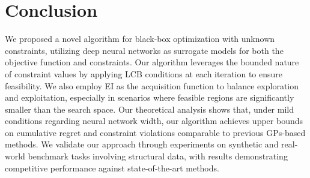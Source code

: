 \section{Conclusion}
We proposed a novel algorithm for black-box optimization with unknown constraints, utilizing deep neural networks as surrogate models for both the objective function and constraints. Our algorithm leverages the bounded nature of constraint values by applying LCB conditions at each iteration to ensure feasibility. We also employ EI as the acquisition function to balance exploration and exploitation, especially in scenarios where feasible regions are significantly smaller than the search space. Our theoretical analysis shows that, under mild conditions regarding neural network width, our algorithm achieves upper bounds on cumulative regret and constraint violations comparable to previous GPs-based methods. We validate our approach through experiments on synthetic and real-world benchmark tasks involving structural data, with results demonstrating competitive performance against state-of-the-art methods.

